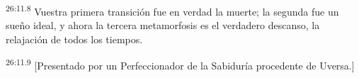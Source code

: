 \par
\textsuperscript{26:11.8} Vuestra primera transición fue en verdad la muerte; la segunda fue un sueño ideal, y ahora la tercera metamorfosis es el verdadero descanso, la relajación de todos los tiempos.

\par
\textsuperscript{26:11.9} [Presentado por un Perfeccionador de la Sabiduría procedente de Uversa.]